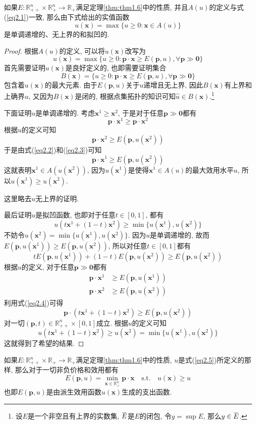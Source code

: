 \documentclass[cn, 12pt, math=mtpro2, bibstyle=apa, blue, twocol]{elegantbook}
\newcommand{\R}{\mathbb{R}}
\newcommand{\p}{\mathbf{p}}
\newcommand{\x}{\mathbf{x}}
\newcommand{\overbar}[1]{\mkern 1.5mu\overline{\mkern-1.5mu#1\mkern-1.5mu}\mkern 1.5mu}
\begin{document}
\begin{theorem}\label{thm:thm2.1}
  如果$E:\R_{++}^n\times\R_+^n\to\R_+$满足定理\ref{thm:thm1.6}中的性质, 并且$A(u)$的定义与式(\ref{eq2.1})一致, 那么由下式给出的实值函数
  \begin{equation}\label{eq2.5}
    u(\x)=\max\{u\ge0: \x\in A(u)\}
  \end{equation}
  是单调递增的、无上界的和拟凹的.
\end{theorem}
\begin{proof}
  根据$A(u)$的定义, 可以将$u(\x)$改写为
  $$u(\x)=\max\{u\ge0: \p\cdot\x\geq E(\p,u),\forall \p\gg\mathbf{0}\}$$
  首先需要证明$u(\x)$是良好定义的, 也即需要证明集合
  $$B(\x)=\{u\ge0: \p\cdot\x\geq E(\p,u),\forall \p\gg\mathbf{0}\}$$
  包含着$u(\x)$的最大元素. 由于$E(\p,u)$关于$u$递增且无上界, 因此$B(\x)$有上界和上确界$\hat{u}$, 又因为$B(\x)$是闭的, 根据点集拓扑的知识可知$\hat{u}\in B(\x)$.\footnote{设$E$是一个非空且有上界的实数集, $\overbar{E}$是$E$的闭包, 令$y=\sup E$, 那么$y\in\overbar{E}$.}
  
  下面证明$u$是单调递增的. 考虑$\x^1\ge\x^2$, 于是对于任意$\p\gg\mathbf{0}$都有
  \begin{equation}\label{eq2.2}
    \p\cdot\x^1\ge\p\cdot\x^2
  \end{equation}
  根据$u$的定义可知
  \begin{equation}\label{eq2.3}
    \p\cdot\x^2\geq E(\p,u(\x^2))
  \end{equation}
  于是由式(\ref{eq2.2})和(\ref{eq2.3})可知
  $$\p\cdot\x^1\geq E(\p,u(\x^2))$$
  这就表明$\x^1\in A(u(\x^2))$, 因为$u(\x^1)$是使得$\x^1\in A(u)$的最大效用水平$u$, 所以$u(\x^1)\ge u(\x^2)$. 
  
  这里略去$u$无上界的证明. 
  
  最后证明$u$是拟凹函数, 也即对于任意$t\in[0,1]$, 都有
  $$u(t\x^1+(1-t)\x^2)\geq \min\{u(\x^1), u(\x^2)\}$$
  不妨令$u(\x^2)=\min\{u(\x^1), u(\x^2)\}$. 因为$u$是单调递增的, 故而$E(\p,u(\x^1))\geq E(\p,u(\x^2))$, 所以对任意$t\in[0,1]$都有
  \begin{equation}\label{eq2.4}
    tE(\p,u(\x^1))+(1-t)E(\p,u(\x^2))\geq E(\p,u(\x^2))
  \end{equation}
  根据$u$的定义, 对于任意$\p\gg\mathbf{0}$都有
  \begin{align*}
  \p\cdot\x^1&\geq E(\p,u(\x^1)) \\
  \p\cdot\x^2&\geq E(\p,u(\x^2))
  \end{align*}
  利用式(\ref{eq2.4})可得
  $$\p\cdot(t\x^1+(1-t)\x^2)\geq E(\p,u(\x^2))$$
  对一切$(\p,t)\in\R_{++}^n\times [0,1]$成立. 根据$u$的定义可知
  $$u(t\x^1+(1-t)\x^2)\geq u(\x^2)=\min\{u(\x^1),u(\x^2)\}$$
  这就得到了希望的结果.
\end{proof}

\begin{theorem}
  如果$E:\R_{++}^n\times\R_+\to\R_+$满足定理\ref{thm:thm1.6}中的性质, $u$是式(\ref{eq2.5})所定义的那样, 那么对于一切非负价格和效用都有
  $$E(\p,u)=\min_{\x\in\R_+^n}\p\cdot\x\quad\text{s.t.}\quad u(\x)\geq u$$
  也即$E(\p,u)$是由派生效用函数$u(\x)$生成的支出函数.
\end{theorem}
\end{document}
